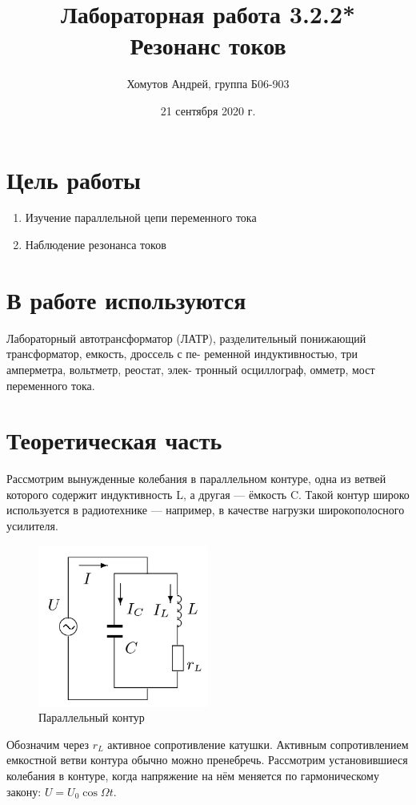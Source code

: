 \documentclass[a4paper, 12pt]{article}
\author{Хомутов Андрей, группа Б06-903}
\title{Лабораторная работа 3.2.2* \\ Резонанс токов
}
\date{21 сентября 2020 г.}
\begin{document}
\maketitle
\thispagestyle{empty}
\newpage

\section*{Цель работы} 
\begin{enumerate}
    \item Изучение параллельной цепи переменного тока
    \item Наблюдение резонанса токов
\end{enumerate}


\section*{В работе используются}
Лабораторный автотрансформатор (ЛАТР),
разделительный понижающий трансформатор, емкость, дроссель с пе-
ременной индуктивностью, три амперметра, вольтметр, реостат, элек-
тронный осциллограф, омметр, мост переменного тока. 

\section{Теоретическая часть}
Рассмотрим вынужденные колебания в параллельном контуре, одна из ветвей которого содержит индуктивность L, а другая — ёмкость C. Такой контур широко используется в радиотехнике — например, в качестве нагрузки широкополосного усилителя.

\begin{figure}[h!]
\begin{center}
\includegraphics[width=0.5\textwidth]{Контур.png}
\end{center}
\caption{Параллельный контур}
\end{figure}
Обозначим через $r_{L}$ активное сопротивление катушки. Активным сопротивлением емкостной ветви контура обычно можно пренебречь. Рассмотрим установившиеся колебания в контуре, когда напряжение на нём меняется по гармоническому закону: $U=U_{0} \cos \Omega t$.
\end{document}
